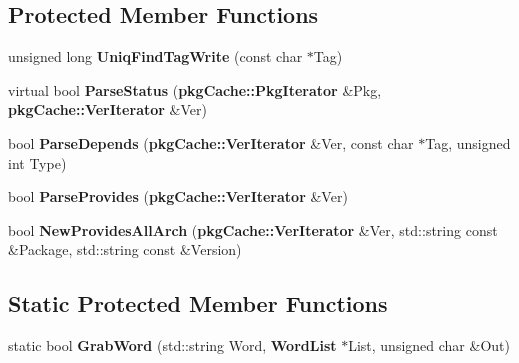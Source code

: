 \subsection*{\-Protected \-Member \-Functions}
\begin{DoxyCompactItemize}
\item 
unsigned long {\bfseries \-Uniq\-Find\-Tag\-Write} (const char $\ast$\-Tag)\label{classdebListParser_a26ad3fcf81e736c9d4105e568641ad5b}

\item 
virtual bool {\bfseries \-Parse\-Status} ({\bf pkg\-Cache\-::\-Pkg\-Iterator} \&\-Pkg, {\bf pkg\-Cache\-::\-Ver\-Iterator} \&\-Ver)\label{classdebListParser_a0086e995b5bccf24c99c487d5081f3f2}

\item 
bool {\bfseries \-Parse\-Depends} ({\bf pkg\-Cache\-::\-Ver\-Iterator} \&\-Ver, const char $\ast$\-Tag, unsigned int \-Type)\label{classdebListParser_ad1a900475e4f7dd9f7afd7f24cdc406a}

\item 
bool {\bfseries \-Parse\-Provides} ({\bf pkg\-Cache\-::\-Ver\-Iterator} \&\-Ver)\label{classdebListParser_a21ffb9af13cac1ea9733e756760aa636}

\item 
bool {\bfseries \-New\-Provides\-All\-Arch} ({\bf pkg\-Cache\-::\-Ver\-Iterator} \&\-Ver, std\-::string const \&\-Package, std\-::string const \&\-Version)\label{classdebListParser_a9dc4c3191f201da455ce88f93485bcac}

\end{DoxyCompactItemize}
\subsection*{\-Static \-Protected \-Member \-Functions}
\begin{DoxyCompactItemize}
\item 
static bool {\bfseries \-Grab\-Word} (std\-::string \-Word, {\bf \-Word\-List} $\ast$\-List, unsigned char \&\-Out)\label{classdebListParser_a9988289674a07dff4ff3b63ce9dbd0f0}

\end{DoxyCompactItemize}
